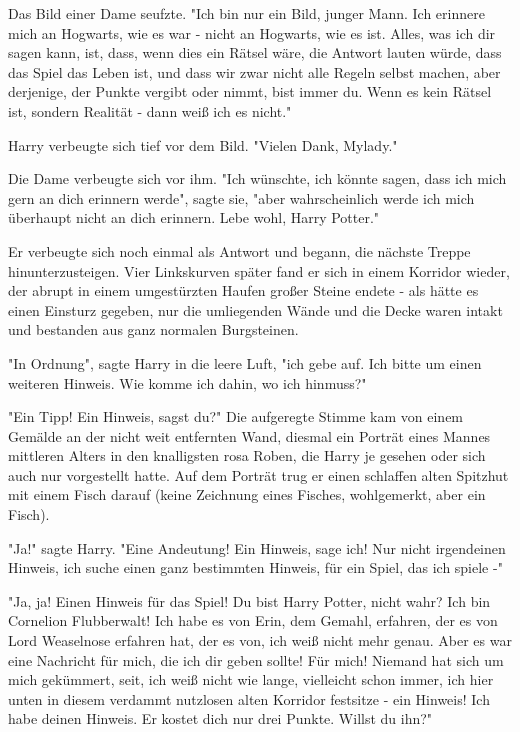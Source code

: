 {Das Bild einer Dame seufzte. "Ich bin nur ein Bild, junger Mann. Ich erinnere mich an Hogwarts, wie es war - nicht an Hogwarts, wie es ist. Alles, was ich dir sagen kann, ist, dass, wenn dies ein Rätsel wäre, die Antwort lauten würde, dass das Spiel das Leben ist, und dass wir zwar nicht alle Regeln selbst machen, aber derjenige, der Punkte vergibt oder nimmt, bist immer du. Wenn es kein Rätsel ist, sondern Realität - dann weiß ich es nicht."

Harry verbeugte sich tief vor dem Bild. "Vielen Dank, Mylady."

Die Dame verbeugte sich vor ihm. "Ich wünschte, ich könnte sagen, dass ich mich gern an dich erinnern werde", sagte sie, "aber wahrscheinlich werde ich mich überhaupt nicht an dich erinnern. Lebe wohl, Harry Potter."

Er verbeugte sich noch einmal als Antwort und begann, die nächste Treppe hinunterzusteigen. Vier Linkskurven später fand er sich in einem Korridor wieder, der abrupt in einem umgestürzten Haufen großer Steine endete - als hätte es einen Einsturz gegeben, nur die umliegenden Wände und die Decke waren intakt und bestanden aus ganz normalen Burgsteinen.

"In Ordnung", sagte Harry in die leere Luft, "ich gebe auf. Ich bitte um einen weiteren Hinweis. Wie komme ich dahin, wo ich hinmuss?"

"Ein Tipp! Ein Hinweis, sagst du?" Die aufgeregte Stimme kam von einem Gemälde an der nicht weit entfernten Wand, diesmal ein Porträt eines Mannes mittleren Alters in den knalligsten rosa Roben, die Harry je gesehen oder sich auch nur vorgestellt hatte. Auf dem Porträt trug er einen schlaffen alten Spitzhut mit einem Fisch darauf (keine Zeichnung eines Fisches, wohlgemerkt, aber ein Fisch).

"Ja!" sagte Harry. "Eine Andeutung! Ein Hinweis, sage ich! Nur nicht irgendeinen Hinweis, ich suche einen ganz bestimmten Hinweis, für ein Spiel, das ich spiele -"

"Ja, ja! Einen Hinweis für das Spiel! Du bist Harry Potter, nicht wahr? Ich bin Cornelion Flubberwalt! Ich habe es von Erin, dem Gemahl, erfahren, der es von Lord Weaselnose erfahren hat, der es von, ich weiß nicht mehr genau. Aber es war eine Nachricht für mich, die ich dir geben sollte! Für mich! Niemand hat sich um mich gekümmert, seit, ich weiß nicht wie lange, vielleicht schon immer, ich hier unten in diesem verdammt nutzlosen alten Korridor festsitze - ein Hinweis! Ich habe deinen Hinweis. Er kostet dich nur drei Punkte. Willst du ihn?"

}
